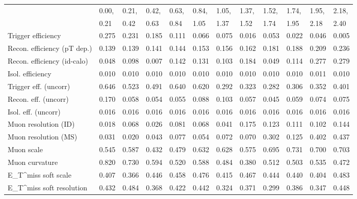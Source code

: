 \begin{tabular}{l|p{0.6cm}p{0.6cm}p{0.6cm}p{0.6cm}p{0.6cm}p{0.6cm}p{0.6cm}p{0.6cm}p{0.6cm}p{0.6cm}p{0.6cm}}
\hline
   & 0.00, & 0.21, & 0.42, & 0.63, & 0.84, & 1.05, & 1.37, & 1.52, & 1.74, & 1.95, & 2.18,  \\ 
   & 0.21 & 0.42 & 0.63 & 0.84 & 1.05 & 1.37 & 1.52 & 1.74 & 1.95 & 2.18 & 2.40  \\ 
\hline
Trigger efficiency                       & 0.275 & 0.231 & 0.185 & 0.111 & 0.066 & 0.075 & 0.016 & 0.053 & 0.022 & 0.046 & 0.005 \\
Recon. efficiency (pT dep.)              & 0.139 & 0.139 & 0.141 & 0.144 & 0.153 & 0.156 & 0.162 & 0.181 & 0.188 & 0.209 & 0.236 \\
Recon. efficiency (id-calo)              & 0.048 & 0.098 & 0.007 & 0.142 & 0.131 & 0.103 & 0.184 & 0.049 & 0.114 & 0.277 & 0.279 \\
Isol. efficiency                         & 0.010 & 0.010 & 0.010 & 0.010 & 0.010 & 0.010 & 0.010 & 0.010 & 0.010 & 0.011 & 0.010 \\
Trigger eff. (uncorr)                    & 0.646 & 0.523 & 0.491 & 0.640 & 0.620 & 0.292 & 0.323 & 0.282 & 0.306 & 0.352 & 0.401 \\
Recon. eff. (uncorr)                     & 0.170 & 0.058 & 0.054 & 0.055 & 0.088 & 0.103 & 0.057 & 0.045 & 0.059 & 0.074 & 0.075 \\
Isol. eff. (uncorr)                      & 0.016 & 0.016 & 0.016 & 0.016 & 0.016 & 0.016 & 0.016 & 0.016 & 0.016 & 0.016 & 0.016 \\
Muon resolution (ID)                     & 0.018 & 0.068 & 0.026 & 0.081 & 0.068 & 0.041 & 0.175 & 0.123 & 0.111 & 0.102 & 0.144 \\
Muon resolution (MS)                     & 0.031 & 0.020 & 0.043 & 0.077 & 0.054 & 0.072 & 0.070 & 0.302 & 0.125 & 0.402 & 0.437 \\
Muon scale                               & 0.545 & 0.587 & 0.432 & 0.479 & 0.632 & 0.628 & 0.575 & 0.695 & 0.731 & 0.700 & 0.703 \\
Muon curvature                           & 0.820 & 0.730 & 0.594 & 0.520 & 0.588 & 0.484 & 0.380 & 0.512 & 0.503 & 0.535 & 0.472 \\
E_{T}^{miss} soft scale                  & 0.407 & 0.366 & 0.446 & 0.458 & 0.476 & 0.415 & 0.467 & 0.444 & 0.440 & 0.404 & 0.483 \\
E_{T}^{miss} soft resolution             & 0.432 & 0.484 & 0.368 & 0.422 & 0.442 & 0.324 & 0.371 & 0.299 & 0.386 & 0.347 & 0.448 \\

\end{tabular}
